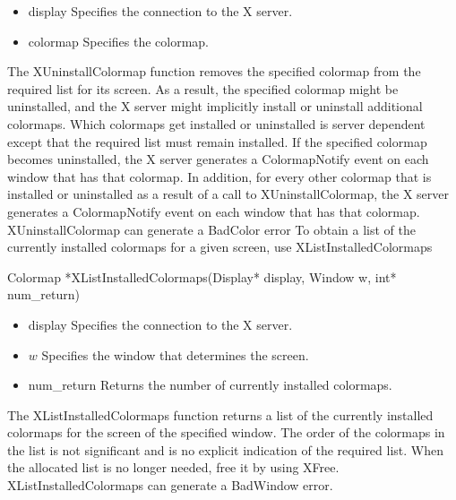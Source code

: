 \documentclass{report}
\begin{document}
\begin{itemize}
\begin{cppcode}
            \end{cppcode}
            \bigbreak \noindent
            \begin{itemize}
                \item display Specifies the connection to the X server.
                \item colormap Specifies the colormap.
            \end{itemize}
            The XUninstallColormap function removes the specified colormap from the required list for its screen. As a result, the specified colormap might be uninstalled, and the X server might implicitly install or uninstall additional colormaps. Which colormaps get installed or uninstalled is server dependent except that the required list must remain installed.
            \bigbreak \noindent 
            If the specified colormap becomes uninstalled, the X server generates a ColormapNotify event on each window that has that colormap. In addition, for every other colormap that is installed or uninstalled as a result of a call to XUninstallColormap, the X server generates a ColormapNotify event on each window that has that colormap.
            \bigbreak \noindent 
            XUninstallColormap can generate a BadColor error
            \bigbreak \noindent 
            To obtain a list of the currently installed colormaps for a given screen, use XListInstalledColormaps
            \bigbreak \noindent 
            \begin{cppcode}
            Colormap *XListInstalledColormaps(Display* display, Window w, int* num_return)
            \end{cppcode}
            \bigbreak \noindent
            \begin{itemize}
                \item display Specifies the connection to the X server.
                \item $w$ Specifies the window that determines the screen.
                \item num\_return Returns the number of currently installed colormaps.
            \end{itemize}
            The XListInstalledColormaps function returns a list of the currently installed colormaps for the screen of the specified window. The order of the colormaps in the list is not significant and is no explicit indication of the required list. When the allocated list is no longer needed, free it by using XFree.
            \bigbreak \noindent 
            XListInstalledColormaps can generate a BadWindow error.

\end{itemize}
\end{document}
